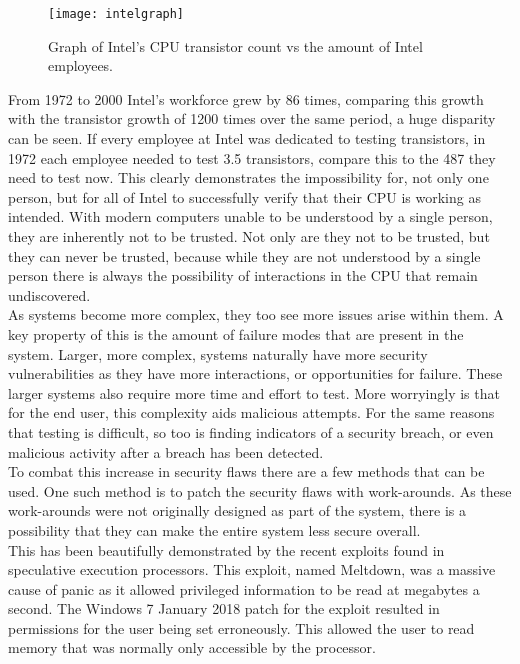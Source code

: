 \begin{figure}
  \centering
  \texttt{[image: intelgraph]}
  \caption{Graph of Intel's CPU transistor count vs the amount of Intel employees.\cite{Reference28}\cite{Reference29}\cite{Reference30}\cite{Reference31}\cite{Reference32}\cite{Reference33}\cite{Reference34}\cite{Reference35}
}
  \label{fig:intelgraph}
\end{figure}

From 1972 to 2000 Intel’s workforce grew by 86 times, comparing this growth with the transistor growth of 1200 times over the same period, a huge disparity can be seen. If every employee at Intel was dedicated to testing transistors, in 1972 each employee needed to test 3.5 transistors, compare this to the 487 they need to test now. This clearly demonstrates the impossibility for, not only one person, but for all of Intel to successfully verify that their CPU is working as intended. With modern computers unable to be understood by a single person, they are inherently not to be trusted.\cite{Reference4} Not only are they not to be trusted, but they can never be trusted, because while they are not understood by a single person there is always the possibility of interactions in the CPU that remain undiscovered.\cite{Reference5}\\
 As systems become more complex, they too see more issues arise within them. A key property of this is the amount of failure modes that are present in the system. Larger, more complex, systems naturally have more security vulnerabilities as they have more interactions, or opportunities for failure.\cite{Reference6} These larger systems also require more time and effort to test. More worryingly is that for the end user, this complexity aids malicious attempts.\cite{Reference7} For the same reasons that testing is difficult, so too is finding indicators of a security breach, or even malicious activity after a breach has been detected.\cite{Reference8}\\
To combat this increase in security flaws there are a few methods that can be used. One such method is to patch the security flaws with work-arounds. As these work-arounds were not originally designed as part of the system, there is a possibility that they can make the entire system less secure overall.\\ 
This has been beautifully demonstrated by the recent exploits found in speculative execution processors. This exploit, named Meltdown, was a massive cause of panic as it allowed privileged information to be read at megabytes a second. The Windows 7 January 2018 patch for the exploit resulted in permissions for the user being set erroneously. This allowed the user to read memory that was normally only accessible by the processor.\cite{Reference9}\\
